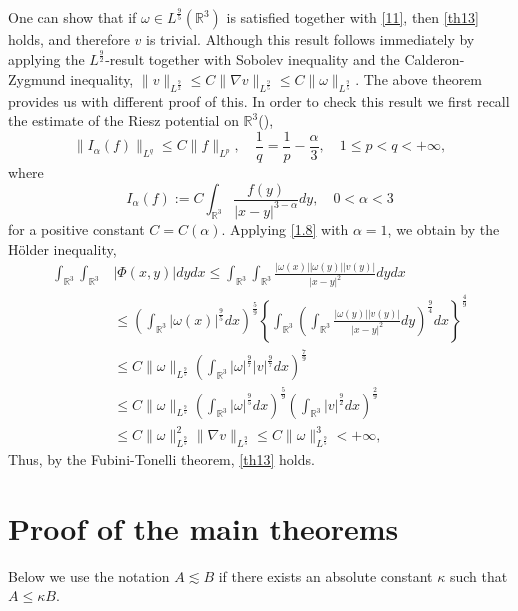 \documentclass[12pt]{article}
\numberwithin{equation}{section}
\theoremstyle{definition}
\begin{document}
 One can show that if ${\omega}\in L^{\frac{9}{5}}(\mathbb{R}^3)$ is satisfied together with \eqref{11}, then
\eqref{th13} holds, and therefore $v$ is trivial. Although this result follows immediately by applying the $L^{\frac92}$-result together with Sobolev inequality
and the Calderon-Zygmund inequality, $\|v\|_{L^{\frac92}} \leq C \|\nabla v\|_{L^{\frac95}} \leq C \|{\omega}\|_{L^{\frac95}}$. The above theorem provides us with different 
proof of this.   In order to check this  result we first recall the estimate of the Riesz potential on $\mathbb{R}^3$(\cite{Stein}),
\begin{equation}
\| I_{\alpha}(f)\|_{L^q}\leq C \| f \|_{L^p},\quad \frac{1}{q}=\frac{1}{p}-\frac{\alpha}{3},\quad
1\leq p < q < +\infty,\label{1.8}
\end{equation}
where
$$I_{\alpha}(f) := C \int_{\mathbb{R}^3}\frac{f(y)}{|x-y|^{3-\alpha}} dy,\quad 0<\alpha<3$$
for a positive constant $C=C(\alpha)$. Applying \eqref{1.8} with $\alpha=1$, we obtain by the H\"{o}lder inequality,
\begin{align*}
\int_{\mathbb{R}^3}\int_{\mathbb{R}^3} &|\Phi(x,y)| dydx
 \leq \int_{\mathbb{R}^3}\int_{\mathbb{R}^3} \frac{|{\omega}(x)||{\omega}(y)||v(y)|}{|x-y|^2} dydx\\
 &\leq \left(\int_{\mathbb{R}^3}|{\omega}(x)|^{\frac{9}{5}}dx\right)^{\frac{5}{9}}
 \left\{ \int_{\mathbb{R}^3}\left(\int_{\mathbb{R}^3} \frac{|{\omega}(y)||v(y)|}{|x-y|^2} dy\right)^{\frac{9}{4}}dx\right\}^{\frac{4}{9}}\\
 &\leq C\| {\omega}\|_{L^{\frac{9}{5}}}\left(\int_{\mathbb{R}^3}|{\omega}|^{\frac{9}{7}}|v|^{\frac{9}{7}}dx\right)^{\frac{7}{9}}\\
 &\leq C\| {\omega}\|_{L^{\frac{9}{5}}}\left(\int_{\mathbb{R}^3} |{\omega}|^{\frac{9}{5}}dx \right)^{\frac{5}{9}}
  \left(\int_{\mathbb{R}^3} |v|^{\frac{9}{2}} dx\right)^{\frac{2}{9}}\\
 &\leq C\|{\omega}\|^2_{L^{\frac{9}{5}}}\|\nabla v\|_{L^{\frac{9}{5}}}\leq C\|{\omega}\|^3_{L^{\frac{9}{5}}}<+\infty,
\end{align*}
Thus, by the Fubini-Tonelli theorem, \eqref{th13}  holds. 

\section{ Proof of the main theorems}
\setcounter{equation}{0}

Below we use the notation $A \lesssim B$ if there exists an absolute constant $\kappa $ such that $A\leq \kappa B$.
\end{document}
